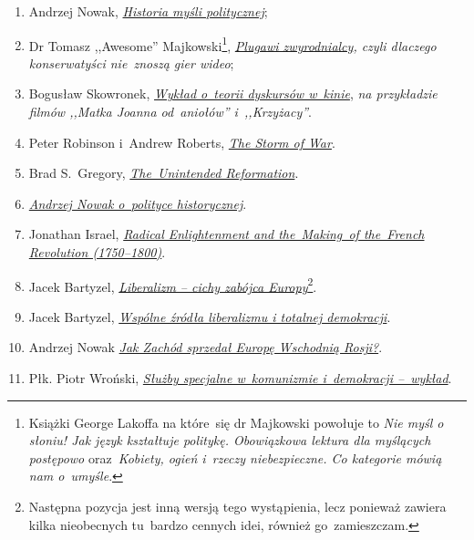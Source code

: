 \documentclass[a4paper,11pt]{article}
\begin{document}
\begin{enumerate}
\item Andrzej Nowak,
  \href{https://www.youtube.com/playlist?list=PLqhZl7VBClOhcjd-y9HF3aUMAIlghQj-l}
  {\emph{Historia myśli politycznej}};
\item Dr Tomasz ,,Awesome'' Majkowski\footnote{Książki George Lakoffa
    na które~się dr Majkowski powołuje to \emph{Nie myśl o słoniu! Jak
      język kształtuje politykę. Obowiązkowa lektura dla myślących
      postępowo} oraz~\emph{Kobiety, ogień i~rzeczy niebezpieczne. Co
      kategorie mówią nam o~umyśle}.},
  \href{https://www.youtube.com/watch?v=jN8h_jLOdnw}{\emph{Plugawi
      zwyrodnialcy}}\emph{, czyli dlaczego konserwatyści nie~znoszą
    gier wideo};
\item Bogusław Skowronek,
  \href{https://www.youtube.com/watch?v=oX5nS3RPZLI\&t=616s}{\emph{Wykład
      o~teorii dyskursów w~kinie}}, \emph{na przykładzie filmów
    ,,Matka Joanna od~aniołów'' i~,,Krzyżacy''}.
\item Peter Robinson i~Andrew Roberts,
  \href{https://www.youtube.com/watch?v=kx0iwRO6jas\&t=4s}{\emph{The
      Storm of War}}.
\item Brad S.~Gregory,
  \href{https://www.youtube.com/watch?v=CqJvLScpn_Y\&t=2s}{\emph{The~Unintended
      Reformation}}.
\item \href{https://www.youtube.com/watch?v=-Z_9L4fE8mA}
  {\emph{Andrzej Nowak o~polityce historycznej}}.
\item Jonathan Israel,
  \href{https://www.youtube.com/watch?v=WBcP7TAVkNQ}{\emph{Radical
      Enlightenment and the~Making~of the~French Revolution
      (1750--1800)}}.
\item Jacek Bartyzel,
  \href{https://www.youtube.com/watch?v=O1YEi-p1XlU}{\emph{Liberalizm
      -- cichy zabójca Europy}}\footnote{Następna pozycja jest inną
    wersją tego wystąpienia, lecz ponieważ zawiera kilka nieobecnych
    tu~bardzo cennych idei, również go~zamieszczam.}.
\item Jacek Bartyzel,
  \href{https://www.youtube.com/watch?v=CxbB16SWq9g}{\emph{Wspólne
      źródła liberalizmu i totalnej demokracji}}.
\item Andrzej Nowak \href{https://www.youtube.com/watch?v=yfQ7rpq_irA}
  {\emph{Jak Zachód sprzedał Europę Wschodnią Rosji?}}.
\item Płk. Piotr Wroński,
  \href{https://www.youtube.com/watch?v=grUVKH7woxE}{\emph{Służby
      specjalne w~komunizmie i~demokracji --~wykład}}.
\end{enumerate}
\end{document}
